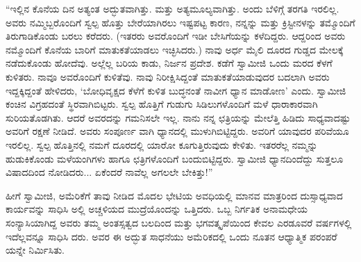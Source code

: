 “ಇಲ್ಲಿನ ಕೊನೆಯ ದಿನ ಅತ್ಯಂತ ಅದ್ಭುತವಾಗಿತ್ತು. ಮತ್ತು ಅತ್ಯಮೂಲ್ಯವಾಗಿತ್ತು. ಅಂದು ಬೆಳಿಗ್ಗೆ ತರಗತಿ ಇರಲಿಲ್ಲ. ಅವರು ನಮ್ಮಿಬ್ಬರೊಂದಿಗೆ ಸ್ವಲ್ಪ ಹೊತ್ತು ಬೇರೆಯಾಗಿರಲು ಇಷ್ಟಪಟ್ಟ ಕಾರಣ, ನನ್ನನ್ನು ಮತ್ತು ಕ್ರಿಸ್ಟೀನಳನ್ನು ತಮ್ಮೊಂದಿಗೆ ತಿರುಗಾಡಿಕೊಂಡು ಬರಲು ಕರೆದರು. (ಇತರರು ಅವರೊಂದಿಗೆ ಇಡೀ ಬೇಸಿಗೆಯನ್ನು ಕಳೆದಿದ್ದರು. ಆದ್ದರಿಂದ ಅವರು ನಮ್ಮೊಂದಿಗೆ ಕೊನೆಯ ಬಾರಿಗೆ ಮಾತುಕತೆಯಾಡಲು ಇಚ್ಛಿಸಿದರು.) ನಾವು ಅರ್ಧ ಮೈಲಿ ದೂರದ ಗುಡ್ಡದ ಮೇಲಕ್ಕೆ ನಡೆದುಕೊಂಡು ಹೋದೆವು. ಅಲ್ಲೆಲ್ಲ ಬರಿಯ ಕಾಡು, ನಿರ್ಜನ ಪ್ರದೇಶ. ಕಡೆಗೆ ಸ್ವಾಮೀಜಿ ಒಂದು ಮರದ ಕೆಳಗೆ ಕುಳಿತರು. ನಾವೂ ಅವರೊಂದಿಗೆ ಕುಳಿತೆವು. ನಾವು ನಿರೀಕ್ಷಿಸಿದ್ದಂತೆ ಮಾತುಕತೆಯಾಡುವುದರ ಬದಲಾಗಿ ಅವರು ಇದ್ದಕ್ಕಿದ್ದಂತೆ ಹೇಳಿದರು, ‘ಬೋಧಿವೃಕ್ಷದ ಕೆಳೆಗೆ ಕುಳಿತ ಬುದ್ಧನಂತೆ ನಾವೀಗ ಧ್ಯಾನ ಮಾಡೋಣ’ ಎಂದು. ಸ್ವಾಮೀಜಿ ಕಂಚಿನ ವಿಗ್ರಹದಂತೆ ಸ್ಥಿರವಾಗಿಬಿಟ್ಟರು. ಸ್ವಲ್ಪ ಹೊತ್ತಿಗೆ ಗುಡುಗು ಸಿಡಿಲುಗಳೊಂದಿಗೆ ಮಳೆ ಧಾರಾಕಾರವಾಗಿ ಸುರಿಯತೊಡಗಿತು. ಆದರೆ ಅವರದನ್ನು ಗಮನಿಸಲೇ ಇಲ್ಲ. ನಾನು ನನ್ನ ಛತ್ರಿಯನ್ನು ಮೇಲೆತ್ತಿ ಹಿಡಿದು ಸಾಧ್ಯವಾದಷ್ಟು ಅವರಿಗೆ ರಕ್ಷಣೆ ನೀಡಿದೆ. ಅವರು ಸಂಪೂರ್ಣ ವಾಗಿ ಧ್ಯಾನದಲ್ಲಿ ಮುಳುಗಿಬಿಟ್ಟಿದ್ದರು. ಅವರಿಗೆ ಯಾವುದರ ಪರಿವೆಯೂ ಇರಲಿಲ್ಲ. ಸ್ವಲ್ಪ ಹೊತ್ತಿನಲ್ಲಿ ನಮಗೆ ದೂರದಲ್ಲಿ ಯಾರೋ ಕೂಗುತ್ತಿರುವುದು ಕೇಳಿತು. ಇತರರೆಲ್ಲ ನಮ್ಮನ್ನು ಹುಡುಕಿಕೊಂಡು ಮಳೆಯಂಗಿಗಳು ಹಾಗೂ ಛತ್ರಿಗಳೊಂದಿಗೆ ಬಂದುಬಿಟ್ಟಿದ್ದರು. ಸ್ವಾಮೀಜಿ ಧ್ಯಾನದಿಂದೆದ್ದು ಸುತ್ತಲೂ ವಿಷಾದದಿಂದ ನೋಡಿದರು... ಏಕೆಂದರೆ ನಾವೆಲ್ಲ ಅಗಲಲೇ ಬೇಕಿತ್ತು!”

ಹೀಗೆ ಸ್ವಾಮೀಜಿ, ಅಮೆರಿಕೆಗೆ ತಾವು ನೀಡಿದ ಮೊದಲ ಭೇಟಿಯ ಅವಧಿಯಲ್ಲಿ ಮಾನವ ಮಾತ್ರರಿಂದ ದುಸ್ಸಾಧ್ಯವಾದ ಕಾರ್ಯವನ್ನು ಸಾಧಿಸಿ ಅಲ್ಲಿ ಅಚ್ಚಳಿಯದ ಮುದ್ರೆಯೊಂದನ್ನು ಒತ್ತಿದರು. ಒಬ್ಬ ನಿರ್ಗತಿಕ ಅನಾಮಧೇಯ ಸಂನ್ಯಾಸಿಯಾಗಿದ್ದ ಅವರು ತಮ್ಮ ಅಂತಸ್ಸತ್ವದ ಬಲದಿಂದ ಮತ್ತು ಭಗವತ್ಕೃಪೆಯಿಂದ ಕೇವಲ ಎರಡೂವರೆ ವರ್ಷಗಳಲ್ಲಿ ಇದೆಲ್ಲವನ್ನೂ ಸಾಧಿಸಿ ದರು. ಅವರ ಈ ಅದ್ಭುತ ಸಾಧನೆಯು ಅಮೆರಿಕದಲ್ಲಿ ಒಂದು ನೂತನ ಆಧ್ಯಾತ್ಮಿಕ ಪರಂಪರೆ ಯನ್ನೇ ನಿರ್ಮಿಸಿತು.

